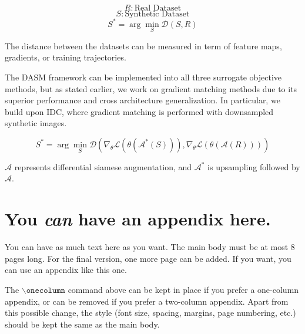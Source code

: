 \documentclass{article}
\theoremstyle{plain}
\theoremstyle{definition}
\theoremstyle{remark}
\begin{document}
\begin{equation}
R: \text{Real Dataset}
\end{equation}
\begin{equation}
S: \text{Synthetic Dataset}
\end{equation}
\begin{equation}
S^* = \arg \min_{S} \mathcal{D}(S,R)
\end{equation}

The distance between the datasets can be measured in term of feature maps, gradients, or training trajectories. 

The  DASM framework can be implemented into all three surrogate objective methods, but as stated earlier, we work on gradient matching methods due to its superior performance and cross architecture generalization. In particular, we build upon IDC, where gradient matching is performed with downsampled synthetic images.

\begin{equation}
S^* = \arg \min_{S} \mathcal{D} \left( \nabla_{\theta} \mathcal{L}(\theta(\mathcal{A}^*(S))), \nabla_{\theta} \mathcal{L}(\theta(\mathcal{A}(R))) \right)
\end{equation}

$\mathcal{A}$ represents differential siamese augmentation, and $\mathcal{A}^*$ is upsampling followed by $\mathcal{A}$.






\nocite{langley00}





\newpage
\appendix
\onecolumn
\section{You \emph{can} have an appendix here.}

You can have as much text here as you want. The main body must be at most $8$ pages long.
For the final version, one more page can be added.
If you want, you can use an appendix like this one.  

The $\mathtt{\backslash onecolumn}$ command above can be kept in place if you prefer a one-column appendix, or can be removed if you prefer a two-column appendix.  Apart from this possible change, the style (font size, spacing, margins, page numbering, etc.) should be kept the same as the main body.
\end{document}
